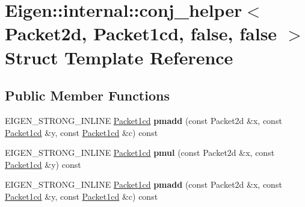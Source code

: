 \hypertarget{struct_eigen_1_1internal_1_1conj__helper_3_01_packet2d_00_01_packet1cd_00_01false_00_01false_01_4}{}\section{Eigen\+:\+:internal\+:\+:conj\+\_\+helper$<$ Packet2d, Packet1cd, false, false $>$ Struct Template Reference}
\label{struct_eigen_1_1internal_1_1conj__helper_3_01_packet2d_00_01_packet1cd_00_01false_00_01false_01_4}
\subsection*{Public Member Functions}
\begin{DoxyCompactItemize}
\item 
\mbox{\label{struct_eigen_1_1internal_1_1conj__helper_3_01_packet2d_00_01_packet1cd_00_01false_00_01false_01_4_a3291b9b61371756247d5f7cbde8f6887}} 
E\+I\+G\+E\+N\+\_\+\+S\+T\+R\+O\+N\+G\+\_\+\+I\+N\+L\+I\+NE \hyperlink{struct_eigen_1_1internal_1_1_packet1cd}{Packet1cd} {\bfseries pmadd} (const Packet2d \&x, const \hyperlink{struct_eigen_1_1internal_1_1_packet1cd}{Packet1cd} \&y, const \hyperlink{struct_eigen_1_1internal_1_1_packet1cd}{Packet1cd} \&c) const
\item 
\mbox{\label{struct_eigen_1_1internal_1_1conj__helper_3_01_packet2d_00_01_packet1cd_00_01false_00_01false_01_4_ac33f153d3f24652b65a83df7bfd7f837}} 
E\+I\+G\+E\+N\+\_\+\+S\+T\+R\+O\+N\+G\+\_\+\+I\+N\+L\+I\+NE \hyperlink{struct_eigen_1_1internal_1_1_packet1cd}{Packet1cd} {\bfseries pmul} (const Packet2d \&x, const \hyperlink{struct_eigen_1_1internal_1_1_packet1cd}{Packet1cd} \&y) const
\item 
\mbox{\label{struct_eigen_1_1internal_1_1conj__helper_3_01_packet2d_00_01_packet1cd_00_01false_00_01false_01_4_a3291b9b61371756247d5f7cbde8f6887}} 
E\+I\+G\+E\+N\+\_\+\+S\+T\+R\+O\+N\+G\+\_\+\+I\+N\+L\+I\+NE \hyperlink{struct_eigen_1_1internal_1_1_packet1cd}{Packet1cd} {\bfseries pmadd} (const Packet2d \&x, const \hyperlink{struct_eigen_1_1internal_1_1_packet1cd}{Packet1cd} \&y, const \hyperlink{struct_eigen_1_1internal_1_1_packet1cd}{Packet1cd} \&c) const

\end{DoxyCompactItemize}
